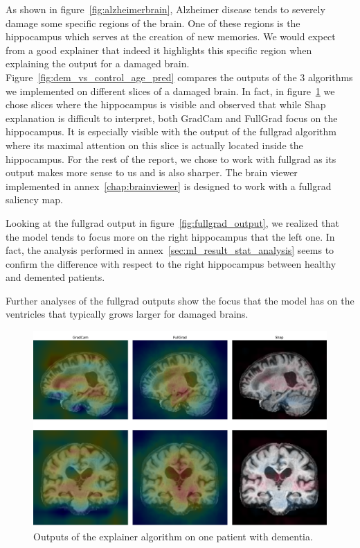 As shown in figure~\ref{fig:alzheimerbrain}, Alzheimer disease tends to severely damage some specific regions of the brain. One of these regions is the hippocampus which serves at the creation of new memories. We would expect from a good explainer that indeed it highlights this specific region when explaining the output for a damaged brain. Figure~\ref{fig:dem_vs_control_age_pred} compares the outputs of the 3 algorithms we implemented on different slices of a damaged brain. In fact, in figure~\ref{fig:explainer_compared} we chose slices where the hippocampus is visible and observed that while Shap explanation is difficult to interpret, both GradCam and FullGrad focus on the hippocampus. It is especially visible with the output of the fullgrad algorithm where its maximal attention on this slice is actually located inside the hippocampus. For the rest of the report, we chose to work with fullgrad as its output makes more sense to us and is also sharper. The brain viewer implemented in annex~\ref{chap:brainviewer} is designed to work with a fullgrad saliency map.

Looking at the fullgrad output in figure~\ref{fig:fullgrad_output}, we realized that the model tends to focus more on the right hippocampus that the left one. In fact, the analysis performed in annex~\ref{sec:ml_result_stat_analysis} seems to confirm the difference with respect to the right hippocampus between healthy and demented patients.

Further analyses of the fullgrad outputs show the focus that the model has on the ventricles that typically grows larger for damaged brains.


\begin{figure}
    \centering
    \includegraphics[width=0.9\linewidth]{figures/Experiements/explainer_coparaison.pdf}
    \caption{Outputs of the explainer algorithm on one patient with dementia.}
    \label{fig:explainer_compared}
\end{figure}

